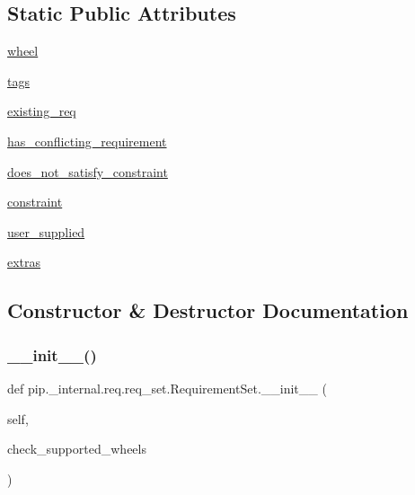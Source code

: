 \subsection*{Static Public Attributes}
\begin{DoxyCompactItemize}
\item 
\hyperlink{classpip_1_1__internal_1_1req_1_1req__set_1_1RequirementSet_ab20062b07874e2b728827c89cff17f68}{wheel}
\item 
\hyperlink{classpip_1_1__internal_1_1req_1_1req__set_1_1RequirementSet_afaf791259ee5678a1486cd772f0ea2be}{tags}
\item 
\hyperlink{classpip_1_1__internal_1_1req_1_1req__set_1_1RequirementSet_ab56334f1f2a897a01ab3aef0de9d9431}{existing\+\_\+req}
\item 
\hyperlink{classpip_1_1__internal_1_1req_1_1req__set_1_1RequirementSet_af81d79a85a2c3e0f38226b09074d91a1}{has\+\_\+conflicting\+\_\+requirement}
\item 
\hyperlink{classpip_1_1__internal_1_1req_1_1req__set_1_1RequirementSet_a8ad1a575ae5319e6df9741bc4a109827}{does\+\_\+not\+\_\+satisfy\+\_\+constraint}
\item 
\hyperlink{classpip_1_1__internal_1_1req_1_1req__set_1_1RequirementSet_a8bd6d55a76fcd2da1de51058ed488962}{constraint}
\item 
\hyperlink{classpip_1_1__internal_1_1req_1_1req__set_1_1RequirementSet_aa13bc9d40c97121a5a5cd3cbb07fd657}{user\+\_\+supplied}
\item 
\hyperlink{classpip_1_1__internal_1_1req_1_1req__set_1_1RequirementSet_a998e23eca1e8daadd814c2a66637e7a6}{extras}
\end{DoxyCompactItemize}


\subsection{Constructor \& Destructor Documentation}
\mbox{\label{classpip_1_1__internal_1_1req_1_1req__set_1_1RequirementSet_a652631b789142752e0008f5c63aaf6a0}} 
\subsubsection{\texorpdfstring{\+\_\+\+\_\+init\+\_\+\+\_\+()}{\_\_init\_\_()}}
{\footnotesize\ttfamily def pip.\+\_\+internal.\+req.\+req\+\_\+set.\+Requirement\+Set.\+\_\+\+\_\+init\+\_\+\+\_\+ (\begin{DoxyParamCaption}\item[{}]{self,  }\item[{}]{check\+\_\+supported\+\_\+wheels }\end{DoxyParamCaption})}



